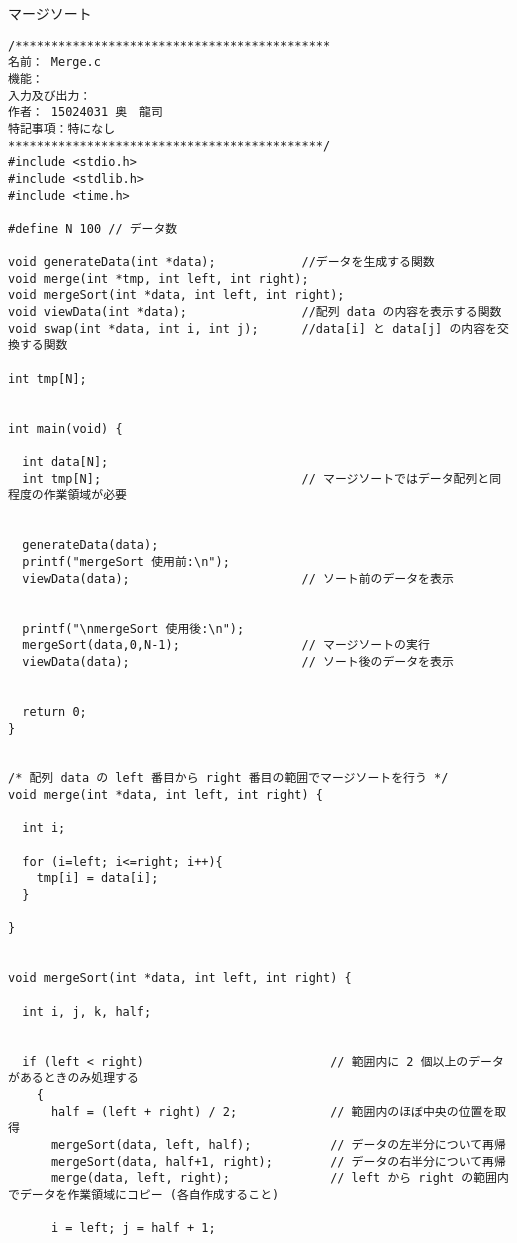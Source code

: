 \documentclass[a4j,titlepage]{jarticle}
\begin{document}
\begin{breakitembox}[l]{マージソート} \small
\begin{verbatim}
/********************************************
名前： Merge.c
機能： 
入力及び出力： 
作者： 15024031 奥　龍司
特記事項：特になし
********************************************/
#include <stdio.h>
#include <stdlib.h>
#include <time.h>

#define N 100 // データ数

void generateData(int *data);            //データを生成する関数
void merge(int *tmp, int left, int right);
void mergeSort(int *data, int left, int right);
void viewData(int *data);                //配列 data の内容を表示する関数
void swap(int *data, int i, int j);      //data[i] と data[j] の内容を交換する関数

int tmp[N];


int main(void) {
  
  int data[N];
  int tmp[N];                            // マージソートではデータ配列と同程度の作業領域が必要

  
  generateData(data);
  printf("mergeSort 使用前:\n");
  viewData(data);                        // ソート前のデータを表示
  

  printf("\nmergeSort 使用後:\n");
  mergeSort(data,0,N-1);                 // マージソートの実行
  viewData(data);                        // ソート後のデータを表示
  

  return 0;
}


/* 配列 data の left 番目から right 番目の範囲でマージソートを行う */
void merge(int *data, int left, int right) {

  int i;

  for (i=left; i<=right; i++){
    tmp[i] = data[i];
  }

}


void mergeSort(int *data, int left, int right) {

  int i, j, k, half;


  if (left < right)                          // 範囲内に 2 個以上のデータがあるときのみ処理する
    {                   
      half = (left + right) / 2;             // 範囲内のほぼ中央の位置を取得
      mergeSort(data, left, half);           // データの左半分について再帰
      mergeSort(data, half+1, right);        // データの右半分について再帰
      merge(data, left, right);              // left から right の範囲内でデータを作業領域にコピー (各自作成すること)
      
      i = left; j = half + 1;
      

\end{verbatim}
\end{breakitembox}
\end{document}
